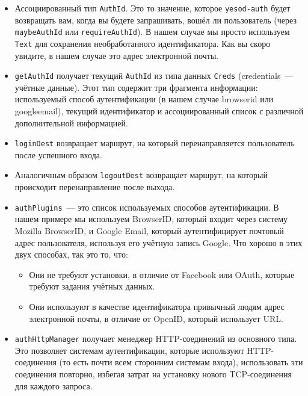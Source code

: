 \begin{itemize}
    \item Ассоциированный тип \lstinline'AuthId'. Это то значение, которое \lstinline'yesod-auth' будет возвращать вам, когда вы будете запрашивать, вошёл ли пользователь (через \lstinline'maybeAuthId' или \lstinline'requireAuthId'). В нашем случае мы просто используем \lstinline'Text' для сохранения необработанного идентификатора. Как вы скоро увидите, в нашем случае это адрес электронной почты. 

    \item \lstinline'getAuthId' получает текущий \lstinline'AuthId' из типа данных \lstinline'Creds' (credentials~--- учётные данные). Этот тип содержит три фрагмента информации: используемый способ аутентификации (в нашем случае browserid или googleemail), текущий идентификатор и ассоциированный список с различной дополнительной информацией.

    \item \lstinline'loginDest' возвращает маршрут, на который перенаправляется пользователь после успешного входа.

    \item Аналогичным образом \lstinline'logoutDest' возвращает маршрут, на который происходит перенаправление после выхода. 

    \item \lstinline'authPlugins'~--- это список используемых способов аутентификации. В нашем примере мы используем BrowserID, который входит через систему Mozilla BrowserID, и Google Email, который аутентифицирует почтовый адрес пользователя, используя его учётную запись Google. Что хорошо в этих двух способах, так это то, что:
    
    \begin{itemize}
        \item Они не требуют установки, в отличие от Facebook или OAuth, которые требуют задания учётных данных.
        
        \item Они используют в качестве идентификатора привычный людям адрес электронной почты, в отличие от OpenID, который использует URL. 
    \end{itemize}
    
    \item \lstinline'authHttpManager' получает менеджер HTTP-соединений из основного типа. Это позволяет системам аутентификации, которые используют HTTP-соединения (то есть почти всем сторонним системам входа), использовать эти соединения повторно, избегая затрат на установку нового TCP-соединения для каждого запроса.
\end{itemize}

